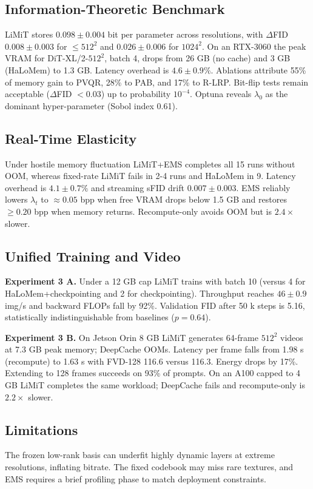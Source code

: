 \documentclass{article}
\begin{document}
\subsection{Information-Theoretic Benchmark}
LiMiT stores $0.098 \pm 0.004$ bit per parameter across resolutions, with $\Delta$FID $0.008 \pm 0.003$ for $\le 512^2$ and $0.026 \pm 0.006$ for $1024^2$. On an RTX-3060 the peak VRAM for DiT-XL/2-$512^2$, batch 4, drops from 26 GB (no cache) and 3 GB (HaLoMem) to 1.3 GB. Latency overhead is $4.6 \pm 0.9\%$. Ablations attribute 55\% of memory gain to PVQR, 28\% to PAB, and 17\% to R-LRP. Bit-flip tests remain acceptable ($\Delta$FID $< 0.03$) up to probability $10^{-4}$. Optuna reveals $\lambda_0$ as the dominant hyper-parameter (Sobol index 0.61).

\subsection{Real-Time Elasticity}
Under hostile memory fluctuation LiMiT+EMS completes all 15 runs without OOM, whereas fixed-rate LiMiT fails in 2-4 runs and HaLoMem in 9. Latency overhead is $4.1 \pm 0.7\%$ and streaming sFID drift $0.007 \pm 0.003$. EMS reliably lowers $\lambda_t$ to $\approx 0.05$ bpp when free VRAM drops below 1.5 GB and restores $\ge 0.20$ bpp when memory returns. Recompute-only avoids OOM but is $2.4\times$ slower.

\subsection{Unified Training and Video}
\textbf{Experiment 3 A.} Under a 12 GB cap LiMiT trains with batch 10 (versus 4 for HaLoMem+checkpointing and 2 for checkpointing). Throughput reaches $46 \pm 0.9$ img/s and backward FLOPs fall by 92\%. Validation FID after 50 k steps is 5.16, statistically indistinguishable from baselines ($p = 0.64$).

\textbf{Experiment 3 B.} On Jetson Orin 8 GB LiMiT generates 64-frame $512^2$ videos at 7.3 GB peak memory; DeepCache OOMs. Latency per frame falls from 1.98 s (recompute) to 1.63 s with FVD-128 116.6 versus 116.3. Energy drops by 17\%. Extending to 128 frames succeeds on 93\% of prompts. On an A100 capped to 4 GB LiMiT completes the same workload; DeepCache fails and recompute-only is $2.2\times$ slower.

\subsection{Limitations}
The frozen low-rank basis can underfit highly dynamic layers at extreme resolutions, inflating bitrate. The fixed codebook may miss rare textures, and EMS requires a brief profiling phase to match deployment constraints.
\end{document}
